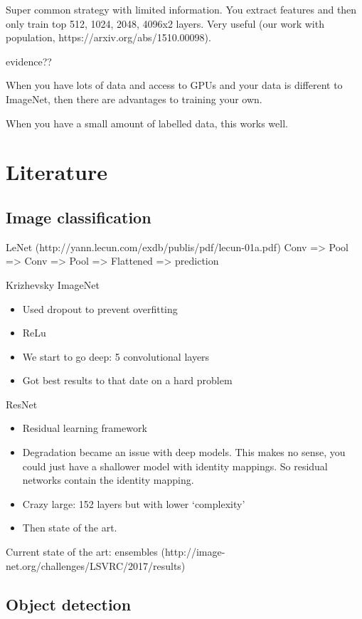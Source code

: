 \documentclass[12pt, a4paper, oneside, headinclude, footinclude]{article}
\begin{document}
Super common strategy with limited information. You extract features and then
only train top 512, 1024, 2048, 4096x2 layers. Very useful (our work with
population, https://arxiv.org/abs/1510.00098).

evidence??

When you have lots of data and access to GPUs and your data is different to
ImageNet, then there are advantages to training your own.

When you have a small amount of labelled data, this works well.

\section{Literature}

\subsection{Image classification}

LeNet (http://yann.lecun.com/exdb/publis/pdf/lecun-01a.pdf)
Conv => Pool => Conv => Pool => Flattened => prediction

Krizhevsky ImageNet~\cite{NIPS2012_4824}
\begin{itemize}
    \item Used dropout to prevent overfitting
    \item ReLu
    \item We start to go deep: 5 convolutional layers
    \item Got best results to that date on a hard problem
\end{itemize}

ResNet~\cite{he2016deep}

\begin{itemize}
    \item Residual learning framework
    \item Degradation became an issue with deep models. This makes no sense,
        you could just have a shallower model with identity mappings. So
        residual networks contain the identity mapping.
    \item Crazy large: 152 layers but with lower `complexity'
    \item Then state of the art.
\end{itemize}

Current state of the art: ensembles
(http://image-net.org/challenges/LSVRC/2017/results)

\subsection{Object detection}
\end{document}
